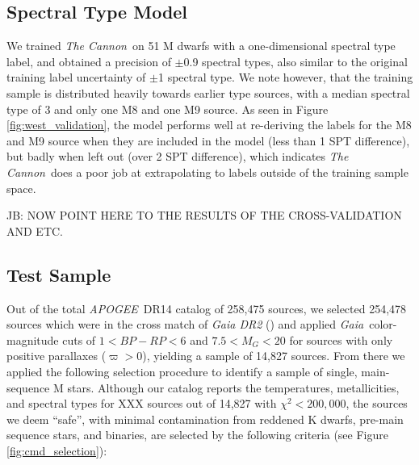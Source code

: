 \documentclass[modern]{aastex62}
\newcommand{\apogee}{\textsl{APOGEE}}
\newcommand{\thecannon}{\textsl{The Cannon}}
\newcommand{\gaia}{\textsl{Gaia}}
\begin{document}
\color{gcolor}{Some note on what lines vary significantly with parameter...}\color{black}

\color{gcolor}{HOGG: Some commentary on why $\chi^2$ is higher than expected. Also explain why this means that the model is good to percent level.}\color{black}

\subsection{Spectral Type Model \label{subsec:west_results}}
We trained \thecannon\ on 51 M dwarfs with a one-dimensional spectral type label, and obtained a precision of $\pm$0.9 spectral types, also similar to the original training label uncertainty of $\pm$1 spectral type. We note however, that the training sample is distributed heavily towards earlier type sources, with a median spectral type of 3 and only one M8 and one M9 source. As seen in Figure \ref{fig:west_validation}, the model performs well at re-deriving the labels for the M8 and M9 source when they are included in the model (less than 1 SPT difference), but badly when left out (over 2 SPT difference), which indicates \thecannon\ does a poor job at extrapolating to labels outside of the training sample space. 

JB: NOW POINT HERE TO THE RESULTS OF THE CROSS-VALIDATION AND ETC.

\color{gcolor}{Further assessment of the reliability of our model for late types?...}\color{black}

\subsection{Test Sample \label{subsec:test_selection}} 
Out of the total \apogee\ DR14 catalog of 258,475 sources, we selected 254,478 sources which were in the cross match of \textsl{Gaia DR2} (\citealt{Brown:2018}) and applied \gaia\ color-magnitude cuts of $1<BP-RP<6$ and $7.5<M_G<20$ for sources with only positive parallaxes ($\varpi>0$), yielding a sample of 14,827 sources. From there we applied the following selection procedure to identify a sample of single, main-sequence M stars. Although our catalog reports the temperatures, metallicities, and spectral types for XXX sources out of 14,827 with $\chi^2<200,000$, the sources we deem ``safe'', with minimal contamination from reddened K dwarfs, pre-main sequence stars, and binaries, are selected by the following criteria (see Figure \ref{fig:cmd_selection}):
\end{document}
